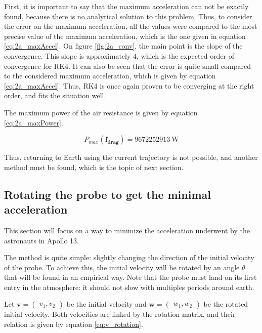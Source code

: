 \documentclass[a4paper,12pt,twoside]{article}
\begin{document}
First, it is important to say that the maximum acceleration can not be exactly found, because there is no analytical solution to this problem.
Thus, to consider the error on the maximum acceleration, all the values were compared to the most precise value of the maximum acceleration, which is the one given in equation \eqref{eq:2a_maxAccel}.
On figure \ref{fig:2a_conv}, the main point is the slope of the convergence.
This slope is approximately $4$, which is the expected order of convergence for RK4.
It can also be seen that the error is quite small compared to the considered maximum acceleration, which is given by equation \eqref{eq:2a_maxAccel}.
Thus, RK4 is once again proven to be converging at the right order, and fits the situation well.

The maximum power of the air resistance is given by equation \eqref{eq:2a_maxPower}.

\begin{equation}
  P_{max}(\mathbf{f_\text{drag}}) = \SI{9672252913}{\watt} %
  \label{eq:2a_maxPower}
\end{equation}


Thus, returning to Earth using the current trajectory is not possible, and another method must be found, which is the topic of next section.


\subsection{Rotating the probe to get the minimal acceleration}
\label{sec:minaccel}
This section will focus on a way to minimize the acceleration underwent by the astronauts in Apollo 13.

The method is quite simple: slightly changing the direction of the initial velocity of the probe.
To achieve this, the initial velocity will be rotated by an angle $\theta$ that will be found in an empirical way.
Note that the probe must land on its first entry in the atmosphere: it should not slow with multiples periods around earth. %

Let $\mathbf{v} = \begin{pmatrix} v_1, v_2\end{pmatrix}$ be the initial velocity and $\mathbf{w} = \begin{pmatrix} w_1, w_2\end{pmatrix}$ be the rotated initial velocity.
Both velocities are linked by the rotation matrix, and their relation is given by equation \eqref{eq:v_rotation}.
\end{document}
